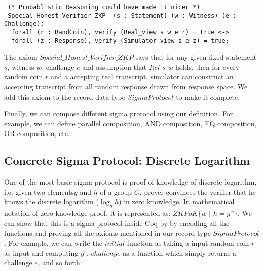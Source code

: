 \begin{verbatim}
 (* Probablistic Reasoning could have made it nicer *)
 Special_Honest_Verifier_ZKP  (s : Statement) (w : Witness) (e : Challenge):
  forall (r : RandCoin), verify (Real_view s w e r) = true <->
  forall (z : Response), verify (Simulator_view s e z) = true;

\end{verbatim}

The axiom $Special\_Honest\_Verifier\_ZKP$ says that for any  given 
fixed statement $s$, witness $w$, challenge $e$ and assumption that $Rel$ $s$ $w$ holds, 
then for every random coin $r$  and a accepting real transcript, simulator can construct 
an accepting transcript from all random response drawn from response space. 
We add this axiom to the record data type $SigmaProtocol$ to make it 
complete. 

Finally, we can compose different  
sigma protocol using our definition. For example, 
we can define parallel composition, AND composition,
EQ composition, OR composition, etc.

\subsection{Concrete Sigma Protocol: Discrete Logarithm}
One of the most basic sigma protocol is proof of knowledge of 
discrete logarithm, i.e. given two elements$g$ and $h$ of 
a group $G$, prover convinces the verifier that 
he knows the discrete logarithm ($\log_g h$) in zero 
knowledge. In mathematical 
notation of zero knowledge proof, it is represented as:
$ZKPoK \lbrace w \text{ | } h = g^w \rbrace$. We can show 
that this is a sigma protocol inside Coq by 
by encoding all the  functions 
and proving all the axioms mentioned in 
our record type $SigmaProtocol$.  For example,
 we can write the $initial$ function as taking a input 
random coin $r$ as input and computing 
$g^r$, $challenge$ as a function which simply returns 
a challenge $e$, and so forth: 


\begin{displayquote}

$\text{initial (r : RandCoin) := } g^r}$  

$\text{challenge := } e$

$\text{response h w r e := } r + e \cdot w$

$\text{verify h a e z  := } g^z = a \cdot h^e$

$\text{simulator s e z := } (g^z \cdot h^{-e}, e, z)$

$\text{extractor }  $c_{1}$ $z_{1}$ $c_{2}$ $z_{2}$ := (z_{1} - z_{2}) \cdot (c_{2} - c_{1})^{-1}$

\end{displayquote}


